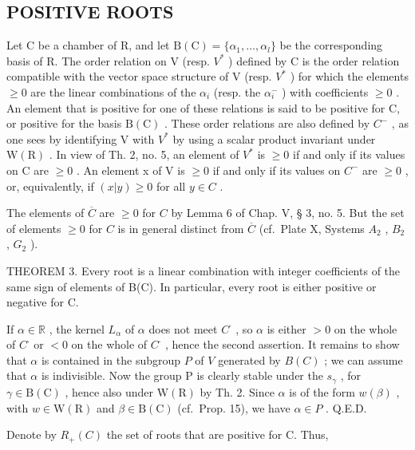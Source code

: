 \subsection{POSITIVE ROOTS}

Let C be a chamber of R, and let \(\mathrm{B}(\mathrm{C})=\{\alpha_{1},\ldots,\alpha_{l}\}\) be the corresponding basis of R. The order relation on V (resp. \(V^{*}\) ) defined by C is the order relation compatible with the vector space structure of V (resp. \(V^{*}\) ) for which the elements \(\geqslant0\) are the linear combinations of the \(\alpha_{i}\) (resp. the \(\alpha_{i}^{-}\) ) with coefficients \(\geqslant0\) . An element that is positive for one of these relations is said to be positive for C, or positive for the basis \(\mathrm{B}(\mathrm{C})\) . These order relations are also defined by \(C^{-}\) , as one sees by identifying V with \(V^{*}\) by using a scalar product invariant under \(\mathrm{W}(\mathrm{R})\) . In view of Th. 2, no. 5, an element of \(V^{*}\) is \(\geqslant0\) if and only if its values on C are \(\geqslant0\) . An element x of V is \(\geqslant0\) if and only if its values on \(C^{-}\) are \(\geqslant0\) , or, equivalently, if \((x|y)\geqslant0\) for all \(y\in C\) .

The elements of \(\overline{C}\) are \(\geqslant 0\) for \(C\) by Lemma 6 of Chap. V, § 3, no. 5. But the set of elements \(\geqslant 0\) for \(C\) is in general distinct from \(\overline{C}\) (cf.~Plate X, Systems \(A_2\) , \(B_2\) , \(G_2\) ).

THEOREM 3. Every root is a linear combination with integer coefficients of the same sign of elements of B(C). In particular, every root is either positive or negative for C.

If \(\alpha \in \mathbb{R}\) , the kernel \(L_{\alpha}\) of \(\alpha\) does not meet \(C^{\cdot}\) , so \(\alpha\) is either \(>0\) on the whole of \(C^{\cdot}\) or \(< 0\) on the whole of \(C^{\cdot}\) , hence the second assertion. It remains to show that \(\alpha\) is contained in the subgroup \(P\) of \(V\) generated by \(B(C)\) ; we can assume that \(\alpha\) is indivisible. Now the group P is clearly stable under the \(s_{\gamma}\) , for \(\gamma \in \mathrm{B}(\mathrm{C})\) , hence also under \(\mathrm{W}(\mathrm{R})\) by Th. 2. Since \(\alpha\) is of the form \(w(\beta)\) , with \(w \in \mathrm{W}(\mathrm{R})\) and \(\beta \in \mathrm{B}(\mathrm{C})\) (cf.~Prop. 15), we have \(\alpha \in P\) . Q.E.D.

Denote by \(R_{+}(C)\) the set of roots that are positive for C. Thus,


